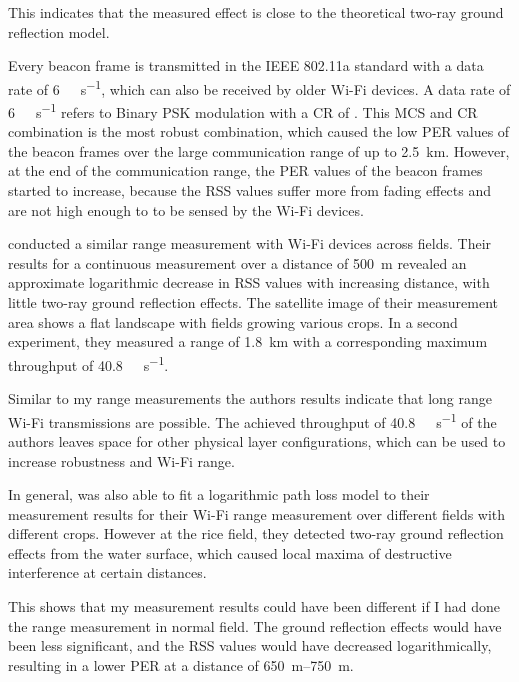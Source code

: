 This indicates that the measured effect is close to the theoretical two-ray ground reflection model.

Every beacon frame is transmitted in the IEEE 802.11a standard with a data rate of \SI{6}{\mega\bit\per\second}, which can also be received
by older Wi-Fi devices.
A data rate of \SI{6}{\mega\bit\per\second} refers to Binary \ac{PSK} modulation with a \ac{CR} of  \cite{ieee_standard_1999}.
This \ac{MCS} and \ac{CR} combination is the most robust combination, which caused the low \ac{PER} values of the beacon frames over
the large communication range of up to \SI{2.5}{\kilo\metre}.
However, at the end of the communication range, the \ac{PER} values of the beacon frames
started to increase, because the \ac{RSS} values suffer more from fading effects and are not high enough to
to be sensed by the Wi-Fi devices.

\textcite{paul_characterizing_2011} conducted a similar range measurement with Wi-Fi devices across fields. Their
results for a continuous measurement over a distance of \SI{500}{\metre} revealed an approximate logarithmic decrease
in \ac{RSS} values with increasing distance, with little two-ray ground reflection effects.
The satellite image of their measurement area shows a flat landscape with fields growing various crops.
In a second experiment, they measured a range of \SI{1. 8}{\kilo\metre} with a corresponding maximum throughput of
\SI{40.8}{\mega\bit\per\second}.

Similar to my range measurements the authors results indicate that long range Wi-Fi transmissions are possible. The achieved throughput of \SI{40.8}{\mega\bit\per\second} of
the authors leaves space for other physical layer configurations, which can be used to increase robustness and Wi-Fi range.

In general, \textcite{brinkhoff_characterization_2017} was also able to fit a logarithmic path loss model to their measurement results
for their Wi-Fi range measurement over different fields with different crops. However at the rice field, they detected
two-ray ground reflection effects from the water surface, which caused local maxima of destructive interference at certain distances.

This shows that my measurement results could have been different if I had done the range measurement in normal field.
The ground reflection effects would have been less significant, and the \ac{RSS} values would have decreased logarithmically,
resulting in a lower \ac{PER} at a distance of \SIrange{650}{750}{\metre}.



